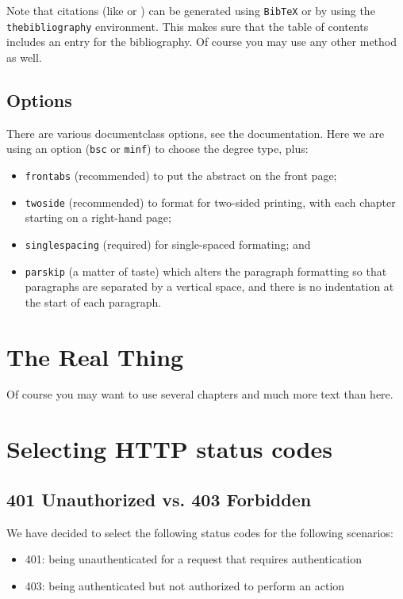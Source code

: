 \documentclass[bsc,frontabs,twoside,singlespacing,parskip,deptreport]{infthesis}     %
\begin{document}
Note that citations
(like \cite{P1} or \cite{P2})
can be generated using {\tt BibTeX} or by using the
{\tt thebibliography} environment. This makes sure that the
table of contents includes an entry for the bibliography.
Of course you may use any other method as well.

\section{Options}

There are various documentclass options, see the documentation.  Here we are
using an option ({\tt bsc} or {\tt minf}) to choose the degree type, plus:
\begin{itemize}
\item {\tt frontabs} (recommended) to put the abstract on the front page;
\item {\tt twoside} (recommended) to format for two-sided printing, with
  each chapter starting on a right-hand page;
\item {\tt singlespacing} (required) for single-spaced formating; and
\item {\tt parskip} (a matter of taste) which alters the paragraph formatting so that
paragraphs are separated by a vertical space, and there is no
indentation at the start of each paragraph.
\end{itemize}

\chapter{The Real Thing}

Of course
you may want to use several chapters and much more text than here.

\chapter{Selecting HTTP status codes}

\section{401 Unauthorized vs. 403 Forbidden}

We have decided to select the following status codes for the following scenarios:

\begin{itemize}
  \item 401: being unauthenticated for a request that requires authentication
  \item 403: being authenticated but not authorized to perform an action
\end{itemize}
\end{document}
